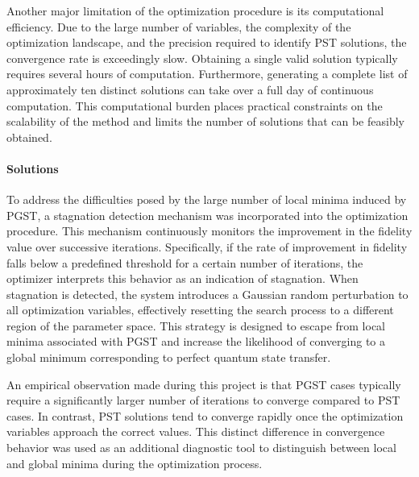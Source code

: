 \documentclass[reprint, aps, 12pt, floatfix]{revtex4-2}
\begin{document}
Another major limitation of the optimization procedure is its computational efficiency. Due to the large number of variables, the complexity of the optimization landscape, and the precision required to identify PST solutions, the convergence rate is exceedingly slow. Obtaining a single valid solution typically requires several hours of computation. Furthermore, generating a complete list of approximately ten distinct solutions can take over a full day of continuous computation. This computational burden places practical constraints on the scalability of the method and limits the number of solutions that can be feasibly obtained.

\paragraph{Solutions}
To address the difficulties posed by the large number of local minima induced by PGST, a stagnation detection mechanism was incorporated into the optimization procedure. This mechanism continuously monitors the improvement in the fidelity value over successive iterations. Specifically, if the rate of improvement in fidelity falls below a predefined threshold for a certain number of iterations, the optimizer interprets this behavior as an indication of stagnation. When stagnation is detected, the system introduces a Gaussian random perturbation to all optimization variables, effectively resetting the search process to a different region of the parameter space. This strategy is designed to escape from local minima associated with PGST and increase the likelihood of converging to a global minimum corresponding to perfect quantum state transfer.

An empirical observation made during this project is that PGST cases typically require a significantly larger number of iterations to converge compared to PST cases. In contrast, PST solutions tend to converge rapidly once the optimization variables approach the correct values. This distinct difference in convergence behavior was used as an additional diagnostic tool to distinguish between local and global minima during the optimization process.
\end{document}
